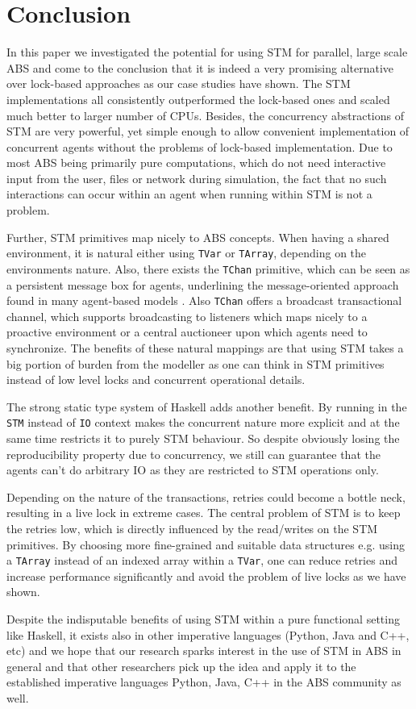 \section{Conclusion} %
\label{sec:conclusion}

In this paper we investigated the potential for using STM for parallel, large scale ABS and come to the conclusion that it is indeed a very promising alternative over lock-based approaches as our case studies have shown. The STM implementations all consistently outperformed the lock-based ones and scaled much better to larger number of CPUs. Besides, the concurrency abstractions of STM are very powerful, yet simple enough to allow convenient implementation of concurrent agents without the problems of lock-based implementation. Due to most ABS being primarily pure computations, which do not need interactive input from the user, files or network during simulation, the fact that no such interactions can occur within an agent when running within STM is not a problem. 

Further, STM primitives map nicely to ABS concepts. When having a shared environment, it is natural either using \texttt{TVar} or \texttt{TArray}, depending on the environments nature. Also, there exists the \texttt{TChan} primitive, which can be seen as a persistent message box for agents, underlining the message-oriented approach found in many agent-based models \cite{agha_actors:_1986, wooldridge_introduction_2009}. Also \texttt{TChan} offers a broadcast transactional channel, which supports broadcasting to listeners which maps nicely to a proactive environment or a central auctioneer upon which agents need to synchronize. The benefits of these natural mappings are that using STM takes a big portion of burden from the modeller as one can think in STM primitives instead of low level locks and concurrent operational details. 

The strong static type system of Haskell adds another benefit. By running in the \texttt{STM} instead of \texttt{IO} context makes the concurrent nature more explicit and at the same time restricts it to purely STM behaviour. So despite obviously losing the reproducibility property due to concurrency, we still can guarantee that the agents can't do arbitrary IO as they are restricted to STM operations only.

Depending on the nature of the transactions, retries could become a bottle neck, resulting in a live lock in extreme cases. The central problem of STM is to keep the retries low, which is directly influenced by the read/writes on the STM primitives. By choosing more fine-grained and suitable data structures e.g. using a \texttt{TArray} instead of an indexed array within a \texttt{TVar}, one can reduce retries and increase performance significantly and avoid the problem of live locks as we have shown.

Despite the indisputable benefits of using STM within a pure functional setting like Haskell, it exists also in other imperative languages (Python, Java and C++, etc) and we hope that our research sparks interest in the use of STM in ABS in general and that other researchers pick up the idea and apply it to the established imperative languages Python, Java, C++ in the ABS community as well.